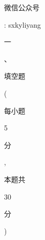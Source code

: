 \documentclass[10pt]{article}
\begin{document}
\begin{CJK}{UTF8}{mj}微信公众号\end{CJK}: sxkyliyang

\begin{CJK}{UTF8}{mj}一\end{CJK}、\begin{CJK}{UTF8}{mj}填空题\end{CJK} (\begin{CJK}{UTF8}{mj}每小题\end{CJK} 5 \begin{CJK}{UTF8}{mj}分\end{CJK}, \begin{CJK}{UTF8}{mj}本题共\end{CJK} 30 \begin{CJK}{UTF8}{mj}分\end{CJK})
\end{document}
